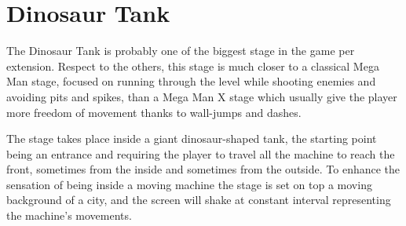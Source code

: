 \section{Dinosaur Tank}
The Dinosaur Tank is probably one of the biggest stage in the game per extension. Respect to the others, this stage is much closer to a classical Mega Man stage, focused on running through the level while shooting enemies and avoiding pits and spikes, than a  Mega Man X stage which usually give the player more freedom of movement thanks to wall-jumps and dashes.

The stage takes place inside a giant dinosaur-shaped tank, the starting point being an entrance and requiring the player to travel all the machine to reach the front, sometimes from the inside and sometimes from the outside. To enhance the sensation of being inside a moving machine the stage is set on top a moving background of a city, and the screen will shake at constant interval representing the machine's movements.

